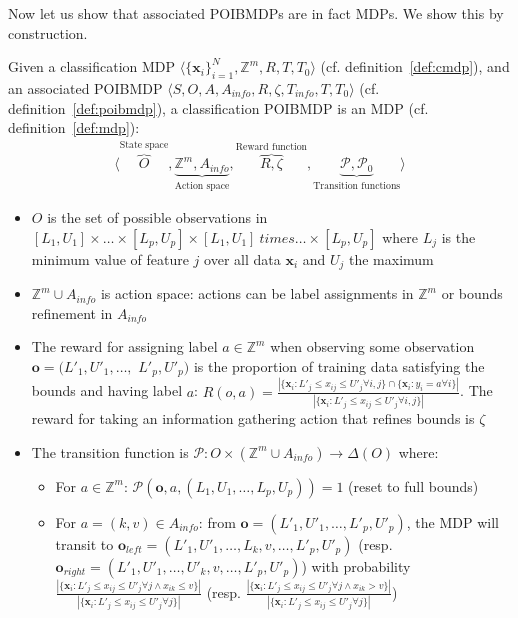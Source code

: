 Now let us show that associated POIBMDPs are in fact MDPs. We show this by construction.

\begin{definition}\label{def:cpoibmdp}
    Given a classification MDP $\langle {\{\boldsymbol{x}_i\}}_{i=1}^N, \mathbb{Z}^m, R, T, T_0 \rangle$ (cf. definition~\ref{def:cmdp}), and an associated POIBMDP $\langle S, O, A, A_{info}, R, \zeta, T_{info}, T, T_0\rangle$ (cf. definition~\ref{def:poibmdp}), a classification POIBMDP is an MDP (cf. definition~\ref{def:mdp}):
    \begin{align*}
        \langle \overbrace{O}^{\text{State space}}, \underbrace{\mathbb{Z}^m, A_{info}}_{\text{Action space}}, \overbrace{R, \zeta}^{\text{Reward function}}, \underbrace{\mathcal{P}, \mathcal{P}_0}_{\text{Transition functions}} \rangle
    \end{align*}
    \begin{itemize}
        \item $O$ is the set of possible observations in $[L_1, U_1] \times \dots \times [L_p, U_p] \times [L_1, U_1] \ times \dots \times [L_p, U_p] $ where $L_j$ is the minimum value of feature $j$ over all data $\boldsymbol{x}_i$ and $U_j$ the maximum
        \item $\mathbb{Z}^m \cup A_{info}$ is action space: actions can be label assignments in $\mathbb{Z}^m$ or bounds refinement in $A_{info}$
        \item The reward for assigning label $a\in \mathbb{Z}^m$ when observing some observation $\boldsymbol{o}=(L'_1, U'_1, \dots,$ $L'_p, U'_p)$ is the proportion of training data satisfying the bounds and having label $a$: $R(o, a) = \frac{|\{\boldsymbol{x}_i: L'_j \leq x_{ij} \leq U'_j \forall i,j \} \cap \{\boldsymbol{x}_i: y_i = a \forall i \}|}{|\{\boldsymbol{x}_i: L'_j \leq x_{ij} \leq U'_j \forall i,j \}|}$. 
        The reward for taking an information gathering action that refines bounds is $\zeta$
        \item The transition function is $\mathcal{P}:O \times (\mathbb{Z}^m \cup A_{info}) \rightarrow \Delta (O)$ where:
        \begin{itemize}
            \item For $a \in \mathbb{Z}^m$: $\mathcal{P}(\boldsymbol{o}, a, (L_1, U_1, \dots, L_p, U_p)) = 1$ (reset to full bounds)
            \item For $a = (k, v) \in A_{info}$: from $\boldsymbol{o}=(L'_1, U'_1, \dots, L'_p, U'_p)$, the MDP will transit to $\boldsymbol{o}_{left} = (L'_1, U'_1, \dots, L_k, v, \dots, L'_p, U'_p)$ (resp. $\boldsymbol{o}_{right} = (L'_1, U'_1, \dots, U'_k, v, \dots, L'_p, U'_p)$) with probability $\frac{|\{\boldsymbol{x}_i: L'_j \leq x_{ij} \leq U'_j \forall j \land x_{ik} \leq v\}|}{|\{\boldsymbol{x}_i: L'_j \leq x_{ij} \leq U'_j \forall j\}|}$ (resp. $\frac{|\{\boldsymbol{x}_i: L'_j \leq x_{ij} \leq U'_j \forall j \land x_{ik} > v\}|}{|\{\boldsymbol{x}_i: L'_j \leq x_{ij} \leq U'_j \forall j\}|}$)
        \end{itemize}
    \end{itemize}
\end{definition}

